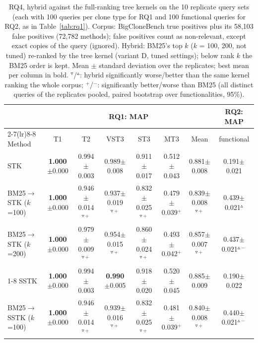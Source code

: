 \begin{table}[!htbp]
\centering
\caption{RQ4, hybrid against the full-ranking tree kernels on the 10 replicate query sets (each with 100 queries per clone type for RQ1 and 100 functional queries for RQ2, as in Table~\ref{tab:rq1}). Corpus: BigCloneBench true positives plus its 58,103 false positives (72,782 methods); false positives count as non-relevant, except exact copies of the query (ignored). Hybrid: BM25's top $k$ ($k$ = 100, 200, not tuned) re-ranked by the tree kernel (variant D, tuned settings); below rank $k$ the BM25 order is kept. Mean $\pm$ standard deviation over the replicates; best mean per column in bold. $^{\triangledown}$/$^{\vartriangle}$: hybrid significantly worse/better than the same kernel ranking the whole corpus; $^{+}$/$^{-}$: significantly better/worse than BM25 (all distinct queries of the replicates pooled, paired bootstrap over functionalities, 95\%).}
\label{tab:hybridrep}
\scriptsize
\setlength{\tabcolsep}{3pt}
\begin{tabular}{lccccccc}
\toprule
 & \multicolumn{6}{c}{RQ1: MAP} & RQ2: MAP \\ \cmidrule(lr){2-7}\cmidrule(lr){8-8}
Method & T1 & T2 & VST3 & ST3 & MT3 & Mean & functional \\
\midrule
\quad STK & \textbf{1.000}$\pm$0.000 & 0.994$\pm$0.003 & 0.989$\pm$0.008 & 0.911$\pm$0.017 & 0.512$\pm$0.043 & 0.881$\pm$0.008 & 0.191$\pm$0.021 \\
\quad BM25$\rightarrow$STK ($k$=100) & \textbf{1.000}$\pm$0.000 & 0.946$\pm$0.014$^{\triangledown+}$ & 0.937$\pm$0.019$^{\triangledown+}$ & 0.832$\pm$0.025$^{\triangledown+}$ & 0.479$\pm$0.039$^{+}$ & 0.839$\pm$0.008$^{\triangledown+}$ & 0.439$\pm$0.021$^{\vartriangle}$ \\
\quad BM25$\rightarrow$STK ($k$=200) & \textbf{1.000}$\pm$0.000 & 0.979$\pm$0.009$^{\triangledown+}$ & 0.954$\pm$0.015$^{\triangledown+}$ & 0.860$\pm$0.024$^{\triangledown+}$ & 0.493$\pm$0.042$^{+}$ & 0.857$\pm$0.007$^{\triangledown+}$ & 0.437$\pm$0.021$^{\vartriangle-}$ \\
\cmidrule(lr){1-8}
\quad SSTK & \textbf{1.000}$\pm$0.000 & 0.994$\pm$0.003 & \textbf{0.990}$\pm$0.005 & 0.918$\pm$0.020 & 0.520$\pm$0.045 & 0.885$\pm$0.009 & 0.190$\pm$0.022 \\
\quad BM25$\rightarrow$SSTK ($k$=100) & \textbf{1.000}$\pm$0.000 & 0.946$\pm$0.014$^{\triangledown+}$ & 0.939$\pm$0.016$^{\triangledown+}$ & 0.832$\pm$0.025$^{\triangledown+}$ & 0.481$\pm$0.039$^{+}$ & 0.840$\pm$0.008$^{\triangledown+}$ & 0.440$\pm$0.021$^{\vartriangle-}$ \\

\end{tabular}
\end{table}
